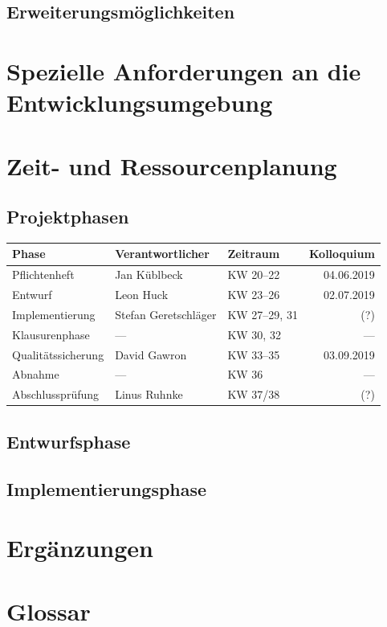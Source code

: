 \documentclass[parskip=full]{scrartcl}
\begin{document}
\subsection{Erweiterungsmöglichkeiten}

\section{Spezielle Anforderungen an die Entwicklungsumgebung}

\section{Zeit- und Ressourcenplanung}

\subsection{Projektphasen}

\begin{tabular}{| l | l | l | r |}
	\hline
	\textbf{Phase} & \textbf{Verantwortlicher} & \textbf{Zeitraum} & \textbf{Kolloquium} \\ \hline
	Pflichtenheft & Jan Küblbeck & KW 20–22 & 04.06.2019 \\
	Entwurf & Leon Huck & KW 23–26 & 02.07.2019 \\
	Implementierung & Stefan Geretschläger & KW 27–29, 31 & (?) \\
	Klausurenphase & — & KW 30, 32 & — \\
	Qualitätssicherung & David Gawron & KW 33–35 & 03.09.2019 \\
	Abnahme & — & KW 36 & — \\
	Abschlussprüfung & Linus Ruhnke & KW 37/38 & (?) \\
	\hline
\end{tabular}

\subsection{Entwurfsphase}

\subsection{Implementierungsphase}

\section{Ergänzungen}

\section{Glossar}

\renewcommand*{\glossarysection}[2][]{}	%
\printnoidxglossaries				%
\end{document}
